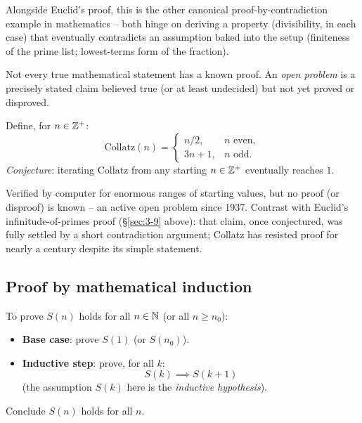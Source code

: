 \begin{note}
Alongside Euclid's proof, this is the other canonical proof-by-contradiction example in mathematics -- both hinge on deriving a property (divisibility, in each case) that eventually contradicts an assumption baked into the setup (finiteness of the prime list; lowest-terms form of the fraction).
\end{note}

\bigskip
\begin{note}
Not every true mathematical statement has a known proof. An \emph{open problem} is a precisely stated claim believed true (or at least undecided) but not yet proved or disproved.
\end{note}

\begin{example}
Define, for $n\in\mathbb{Z}^+$:
\[
\mathrm{Collatz}(n) = \begin{cases} n/2, & n \text{ even}, \\ 3n+1, & n \text{ odd}. \end{cases}
\]
\emph{Conjecture}: iterating $\mathrm{Collatz}$ from any starting $n\in\mathbb{Z}^+$ eventually reaches $1$.
\end{example}

\begin{note}
Verified by computer for enormous ranges of starting values, but no proof (or disproof) is known -- an active open problem since 1937. Contrast with Euclid's infinitude-of-primes proof (\S\ref{sec:3-9} above): that claim, once conjectured, was fully settled by a short contradiction argument; Collatz has resisted proof for nearly a century despite its simple statement.
\end{note}

\subsection{Proof by mathematical induction}
\label{sec:3-10}

\begin{note}
To prove $S(n)$ holds for all $n \in \mathbb{N}$ (or all $n \ge n_0$):
\begin{itemize}
    \item \textbf{Base case}: prove $S(1)$ (or $S(n_0)$).
    \item \textbf{Inductive step}: prove, for all $k$:
    \[
    S(k) \implies S(k+1)
    \]
    (the assumption $S(k)$ here is the \emph{inductive hypothesis}).
\end{itemize}
Conclude $S(n)$ holds for all $n$.
\end{note}

